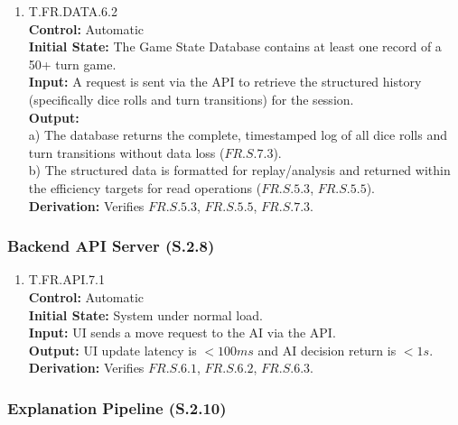 \documentclass[12pt, titlepage]{article}
\begin{document}
\begin{enumerate}
\item{\hypertarget{T.FR.DATA.6.2}{T.FR.DATA.6.2}\\}
\textbf{Control:} Automatic \\
\textbf{Initial State:} The Game State Database contains at least one record of a 50+ turn game. \\
\textbf{Input:} A request is sent via the API to retrieve the structured history (specifically dice rolls and turn transitions) for the session. \\
\textbf{Output:}\\ 
    a) The database returns the complete, timestamped log of all dice rolls and turn transitions without data loss ($\hyperref[FR.S.7.3]{FR.S.7.3}$).  \\
    b) The structured data is formatted for replay/analysis and returned within the efficiency targets for read operations ($\hyperref[FR.S.5.3]{FR.S.5.3}$, $\hyperref[FR.S.5.5]{FR.S.5.5}$). \\
\textbf{Derivation:} Verifies $\hyperref[FR.S.5.3]{FR.S.5.3}$, $\hyperref[FR.S.5.5]{FR.S.5.5}$, $\hyperref[FR.S.7.3]{FR.S.7.3}$.
\end{enumerate}

\subsubsection{Backend API Server (S.2.8)}

\begin{enumerate}
    \item{\hypertarget{T.FR.API.7.1}{T.FR.API.7.1}\\}
    \textbf{Control:} Automatic \\
    \textbf{Initial State:} System under normal load. \\
    \textbf{Input:} UI sends a move request to the AI via the API. \\
    \textbf{Output:} UI update latency is $<100ms$ and AI decision return is $<1s$. \\
    \textbf{Derivation:} Verifies $\hyperref[FR.S.6.1]{FR.S.6.1}$, $\hyperref[FR.S.6.2]{FR.S.6.2}$, $\hyperref[FR.S.6.3]{FR.S.6.3}$.
\end{enumerate}

\subsubsection{Explanation Pipeline (S.2.10)}
\end{document}
